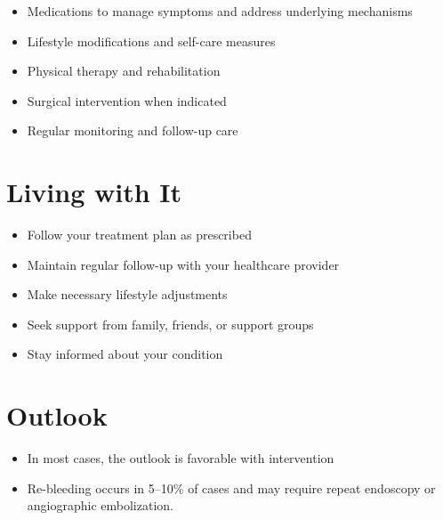 \begin{itemize}[noitemsep]
  \item Medications to manage symptoms and address underlying mechanisms
  \item Lifestyle modifications and self-care measures
  \item Physical therapy and rehabilitation
  \item Surgical intervention when indicated
  \item Regular monitoring and follow-up care
\end{itemize}
\section{Living with It}
\begin{itemize}[noitemsep]
  \item Follow your treatment plan as prescribed
  \item Maintain regular follow-up with your healthcare provider
  \item Make necessary lifestyle adjustments
  \item Seek support from family, friends, or support groups
  \item Stay informed about your condition
\end{itemize}
\section{Outlook}
\begin{itemize}[noitemsep]
  \item In most cases, the outlook is favorable with intervention
  \item Re-bleeding occurs in 5--10\% of cases and may require repeat endoscopy or angiographic embolization.
\end{itemize}
